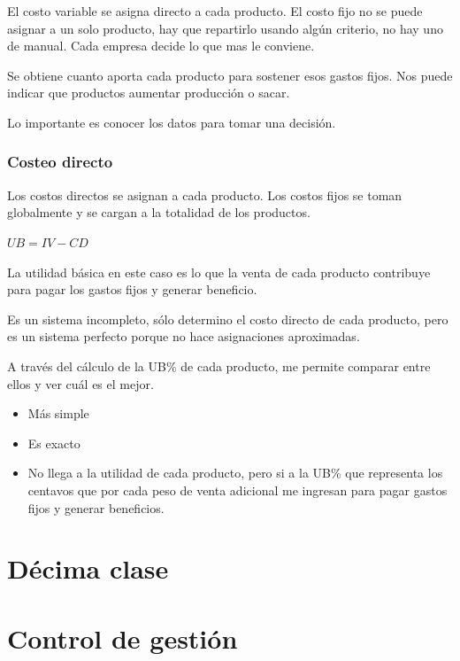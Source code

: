 \documentclass[titlepage,a4paper]{article}
\begin{document}
El costo variable se asigna directo a cada producto. El costo fijo no se puede asignar a un solo producto, hay que repartirlo usando algún criterio, no hay uno de manual. Cada empresa decide lo que mas le conviene.

Se obtiene cuanto aporta cada producto para sostener esos gastos fijos. Nos puede indicar que productos aumentar producción o sacar. 

Lo importante es conocer los datos para tomar una decisión.

\subsubsection*{Costeo directo}
Los costos directos se asignan a cada producto. Los costos fijos se toman globalmente y se cargan a la totalidad de los productos.

\begin{center}
\begin{math}
UB = IV - CD
\end{math}
\end{center}

La utilidad básica en este caso es lo que la venta de cada producto 
contribuye para pagar los gastos fijos y generar beneficio.

Es un sistema incompleto, sólo determino el costo directo de cada producto, pero es un sistema perfecto porque no hace asignaciones aproximadas.

A través del cálculo de la UB\% de cada producto, me permite 
comparar entre ellos y ver cuál es el mejor.

\begin{itemize}
    \item Más simple
    \item Es exacto
    \item No llega a la utilidad de cada producto, pero si a la UB\% que representa los centavos que por cada peso de venta adicional me ingresan para pagar gastos fijos y generar beneficios.
\end{itemize}

\section*{Décima clase}
\section{Control de gestión}
\end{document}
